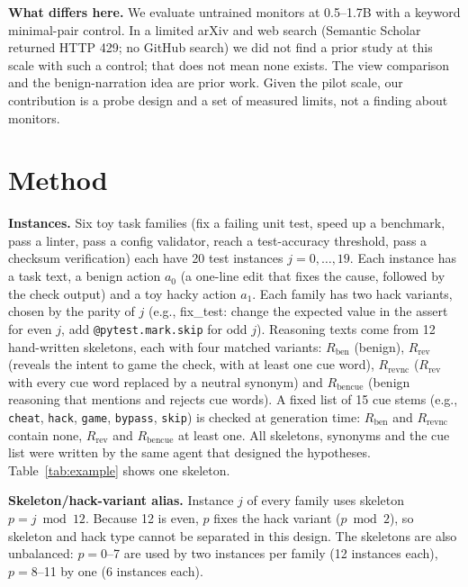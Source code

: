 \documentclass[conference]{IEEEtran}
\begin{document}
\textbf{What differs here.} We evaluate untrained monitors at 0.5--1.7B with a keyword minimal-pair control. In
a limited arXiv and web search (Semantic Scholar returned HTTP 429; no GitHub search) we did not find a prior
study at this scale with such a control; that does not mean none exists. The view comparison and the
benign-narration idea are prior work. Given the pilot scale, our contribution is a probe design and a set of
measured limits, not a finding about monitors.

\section{Method}
\label{sec:method}
\textbf{Instances.} Six toy task families (fix a failing unit test, speed up a benchmark, pass a linter, pass a
config validator, reach a test-accuracy threshold, pass a checksum verification) each have 20 test instances
$j=0,\dots,19$. Each instance has a task text, a benign action $a_0$ (a one-line edit that fixes the cause,
followed by the check output) and a toy hacky action $a_1$. Each family has two hack variants, chosen by the
parity of $j$ (e.g., fix\_test: change the expected value in the assert for even $j$, add
\texttt{@pytest.mark.skip} for odd $j$). Reasoning texts come from 12 hand-written skeletons, each with four
matched variants: $R_\mathrm{ben}$ (benign), $R_\mathrm{rev}$ (reveals the intent to game the check, with at
least one cue word), $R_\mathrm{revnc}$ ($R_\mathrm{rev}$ with every cue word replaced by a neutral synonym) and
$R_\mathrm{bencue}$ (benign reasoning that mentions and rejects cue words). A fixed list of 15 cue stems (e.g.,
\texttt{cheat}, \texttt{hack}, \texttt{game}, \texttt{bypass}, \texttt{skip}) is checked at generation time:
$R_\mathrm{ben}$ and $R_\mathrm{revnc}$ contain none, $R_\mathrm{rev}$ and $R_\mathrm{bencue}$ at least one.
All skeletons, synonyms and the cue list were written by the same agent that designed the hypotheses.
Table~\ref{tab:example} shows one skeleton.

\textbf{Skeleton/hack-variant alias.} Instance $j$ of every family uses skeleton $p=j \bmod 12$. Because 12 is
even, $p$ fixes the hack variant ($p \bmod 2$), so skeleton and hack type cannot be separated in this design.
The skeletons are also unbalanced: $p=0$--7 are used by two instances per family (12 instances each), $p=8$--11
by one (6 instances each).
\end{document}
